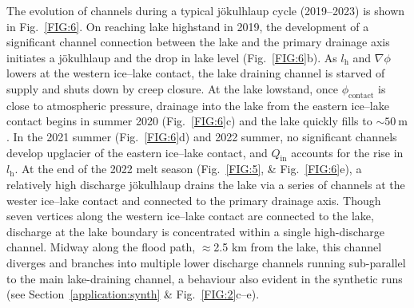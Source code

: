 \documentclass[tc, manuscript]{copernicus}
\begin{document}
The evolution of channels during a typical jökulhlaup cycle (2019--2023) is shown in Fig.~\ref{FIG:6}. On reaching lake highstand in 2019, the development of a significant channel connection between the lake and the primary drainage axis initiates a jökulhlaup and the drop in lake level (Fig.~\ref{FIG:6}b). As $l_{\mathrm{h}}$ and $\nabla\phi$ lowers at the western ice--lake contact, the lake draining channel is starved of supply and shuts down by creep closure. At the lake lowstand, once $\phi_{\mathrm{contact}}$ is close to atmospheric pressure, drainage into the lake from the eastern ice--lake contact begins in summer 2020 (Fig.~\ref{FIG:6}c) and the lake quickly fills to $\sim 50\ \mathrm{m}$. In the 2021 summer (Fig.~\ref{FIG:6}d) and 2022 summer, no significant channels develop upglacier of the eastern ice--lake contact, and $Q_{\mathrm{in}}$ accounts for the rise in $l_{\mathrm{h}}$. At the end of the 2022 melt season (Fig.~\ref{FIG:5}, \& Fig.~\ref{FIG:6}e), a relatively high discharge jökulhlaup drains the lake via a series of channels at the wester ice--lake contact and connected to the primary drainage axis. Though seven vertices along the western ice--lake contact are connected to the lake, discharge at the lake boundary is concentrated within a single high-discharge channel. Midway along the flood path, $\approx$2.5 km from the lake, this channel diverges and branches into multiple lower discharge channels running sub-parallel to the main lake-draining channel, a behaviour also evident in the synthetic runs (see Section~\ref{application:synth} \& Fig.~\ref{FIG:2}c--e). 
\end{document}
